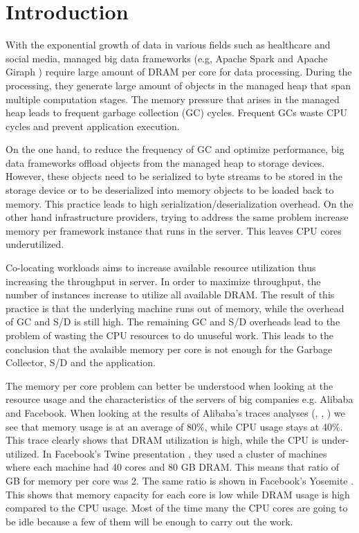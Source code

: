 \section{Introduction}
\label{sec:intro}

With the exponential growth of data in various fields such as
healthcare and social media, managed big data frameworks (e.g, Apache
Spark \cite{Spark} and Apache Giraph \cite{Giraph}) require large
amount of DRAM per core for data processing. During the processing, they generate large
amount of objects in the managed heap that span multiple computation
stages. The memory pressure that arises in the managed heap leads to
frequent garbage collection (GC) cycles. Frequent GCs waste CPU cycles 
and prevent application execution.

On the one hand, to reduce the frequency of GC and optimize performance, big data
frameworks offload objects from the managed heap to storage devices. However, these
objects need to be serialized to byte streams to be stored in the storage
device or to be deserialized into memory objects to be loaded back to memory. 
This practice leads to high serialization/deserialization overhead.
On the other hand infrastructure providers, trying to address the same problem increase memory per framework instance that runs in the server. This leaves CPU cores underutilized. 

Co-locating workloads aims to increase available resource utilization
thus increasing the throughput in server. 
In order to maximize throughput, the number of instances
increase to utilize all available DRAM. The result of this
practice is that the underlying machine runs out of memory, while the
 overhead of GC and S/D is still high. The remaining GC and S/D
overheads lead to the problem of wasting the CPU resources
to do unuseful work. This leads to the conclusion that the avalaible memory per core is
not enough for the Garbage Collector, S/D and the application.

The memory per core problem can better be understood when looking at
the resource usage and the characteristics of the servers of big
companies e.g. Alibaba and Facebook. When looking at the results of
Alibaba's traces analyses (\cite{Alibaba}, \cite{Alibaba1},
\cite{Alibabacolocated}) we see that memory usage is at an average of
80\%, while CPU usage stays at 40\%. This trace clearly shows that
DRAM utilization is high, while the CPU is under-utilized. In
Facebook's Twine presentation \cite{Twine}, they used a cluster of
machines where each machine had 40 cores and 80 GB DRAM. This means
that ratio of GB for memory per core was 2. The same ratio is shown in Facebook's Yosemite
\cite{Yosemite}. This shows that memory
capacity for each core is low while DRAM usage is high compared to the CPU usage. Most of the time many the CPU cores are
going to be idle because a few of them will be enough to carry out the
work.

